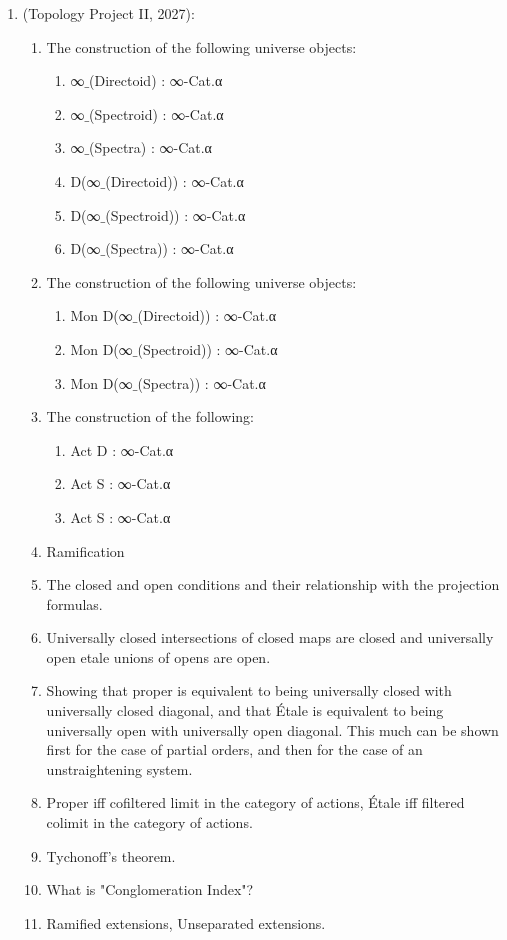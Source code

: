 \documentclass{book}
\begin{document}
\newpage
\begin{center}
\end{center}

\begin{enumerate}
\item (Topology Project II, 2027):
    \begin{enumerate}
    \item The construction of the following universe objects:
    \begin{enumerate}
    \item ∞${}\_$(Directoid) : ∞-Cat.α
    \item ∞${}\_$(Spectroid) : ∞-Cat.α
    \item ∞${}\_$(Spectra) : ∞-Cat.α
    \item D(∞${}\_$(Directoid)) : ∞-Cat.α
    \item D(∞${}\_$(Spectroid)) : ∞-Cat.α
    \item D(∞${}\_$(Spectra)) : ∞-Cat.α
    \end{enumerate}
    \item The construction of the following universe objects:
    \begin{enumerate}
    \item Mon D(∞${}\_$(Directoid)) : ∞-Cat.α
    \item Mon D(∞${}\_$(Spectroid)) : ∞-Cat.α
    \item Mon D(∞${}\_$(Spectra)) : ∞-Cat.α
    \end{enumerate}
    \item The construction of the following:
    \begin{enumerate}
    \item Act D : ∞-Cat.α 
    \item Act S : ∞-Cat.α
    \item Act S : ∞-Cat.α
    \end{enumerate}
    \item Ramification 
    \item The closed and open conditions and their relationship with the projection formulas.
    \item Universally closed intersections of closed maps are closed and universally open etale unions of opens are open.
    \item Showing that proper is equivalent to being universally closed with universally closed diagonal, and that Étale is equivalent to being universally open with universally open diagonal. This much can be shown first for the case of partial orders, and then for the case of an unstraightening system.
    \item Proper iff cofiltered limit in the category of actions, Étale iff filtered colimit in the category of actions.
    \item Tychonoff's theorem.
    \item What is "Conglomeration Index"?
    \item Ramified extensions, Unseparated extensions.
    \end{enumerate}
    \end{enumerate}
\end{document}
